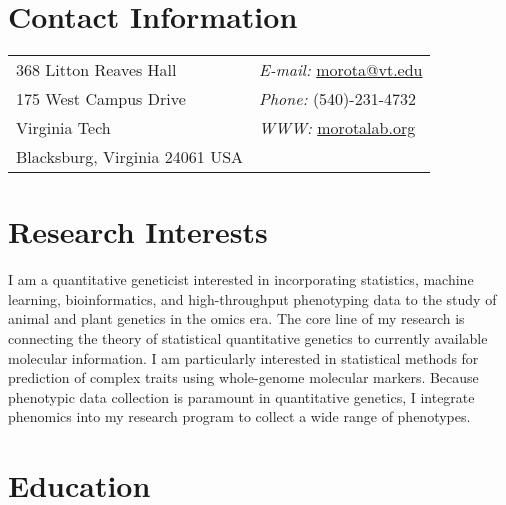 \documentclass[margin,line,10pt]{res}
\begin{document}

\begin{resume}
\section{\sc Contact Information}
\vspace{.05in}
\begin{tabular}{@{}p{2in}p{4in}}
368 Litton Reaves Hall  & \hspace{2.5cm} {\it E-mail:}  \href{mailto:morota@vt.edu}{morota@vt.edu} \\       
175 West Campus Drive  & \hspace{2.5cm} {\it Phone:} (540)-231-4732\\     
Virginia Tech  & \hspace{2.5cm} {\it WWW:} \textcolor{blue}{\href{http://morotalab.org/}{morotalab.org}  }\\
Blacksburg, Virginia 24061 USA  & \\
\end{tabular}


\vspace{0.4cm}
\section{\sc Research Interests}
I am a quantitative geneticist interested in incorporating statistics, machine learning,  bioinformatics, and high-throughput phenotyping data to the study of animal and plant genetics in the omics era. The core line of my research is connecting the theory of statistical quantitative genetics to currently available molecular information. 
I am particularly interested in statistical methods for prediction of complex traits using whole-genome molecular markers. Because phenotypic data collection is paramount in quantitative genetics, I integrate phenomics into my research program to collect a wide range of phenotypes. 


\vspace{0.4cm}
\section{\sc Education}


\end{resume}
\end{document}
